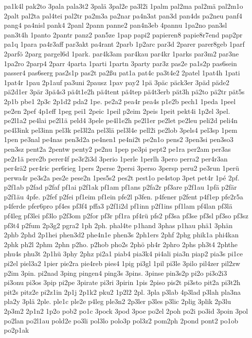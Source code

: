 {pa1k4l
pak2to
3pala
pala3t2
3palä
3pal2e
pa3l2i
1palm
pal2ma
pal2mä
pal2m1o
2palt
pal2ta
pal4tei
pal2tr
pa2m3a
pa2nar
pa4n3at
pan3d
pan4ds
pa2neu
panf4
pang4
pa4nisl
pank4
2panl
2pann
panne2
pan4n3eb
4pannu
1pa2no
pan3sl
pan3t4h
1panto
2pantr
panz2
pan5ze
1pap
papi2
papieren8
papie8r7end
pap2pr
pa1q
1para
pa4r3aff
par3akt
pa4rant
2parb
1p2arc
par3d
2parer
parer8geb
1parf
2parfö
2parg
pargel6d
1park.
par4k3am
par4kau
par4kr
1parks
par3m2
par3ne
1pa2ro
2parp4
2parr
4parta
1parti
1partn
3party
par3z
pas2e
pa1s2p
pas6sein
passer4
pas6serg
pas2s1p
pas2t
pa2ßu
pat1a
pat4c
pa3t4e2
2patel
1pat4h
1pati
1pat4r
1pau
2p1auf
pa3uni
2pausz
1pav
pay2
1pä
3päc
päck3er
3päd
päde2
pä2d1er
3pär
3pä4s3
pä4t1e2h
pä4tent
pä4tep
pä4t3erb
pät3h
pä2to
pä2tr
pät5s
2p1b
pbe1
2p3c
2p1d2
pda2
1pe.
pe2a2
pea4r
pea4s
p1e2b
pech1
1peda
1peel
pe2en
2pef
4p1eff
1peg
pei1
2peic
1peil
p2eim
2peis
1peit
pekt4i
1p2el
3pel.
pe2l1a2
pe4lai
pe2l1ä
peld4
3pele
pe4l1e2h
pe2l1er
pe2let
pe2leu
peli2d
peli4n
pe4l3ink
pel3inn
pel3k
pel3l2a
pel3lä
pel3l4e
pell2i
pe2lob
3pels4
pel3sp
1pem
1pen
pe3nal
pe4nas
pen3d2a
pe4nen1
pe4ni2t
pe2n1o
pens2
3pen3si
pen3so3
pen3sz
pent2a
2pentw
penty2
pe2nu
1pep
pe3pi
pept2
pe1ra
per2am
per3as
pe2r1ä
pere2b
perer4f
pe3r2i3d
3perio
1perle
1perlh
3pero
perra2
per4r3an
per4rä2
per4ric
per6rieg
1pers
2perse
2persi
3perso
3persp
peru2
pe3run
1perü
perwa4r
pe3s2a
pes2e
pese2n
1pes5s2
pes2t
pest1o
pe4stop
3pet
pet4r
1pé
2pf.
p2f1ab
p2fad
p2faf
pf1ai
p2f1ak
pf1am
pf1ans
p2fa2r
pf3are
p2f1au
1pfä
p2fär
p2f1äu
4pfe.
p2fef
p2fei
pf1eim
pf1ein
pfe2l
p3fen.
p4fener
p2fent
p4f1ep
pfe2r5a
p4ferde
pfer6pro
pf4es
pf3f4
pffa3
p2f1i2d
pf1inn
p2f1ins
pf1lam
pf4lan
pf3lä
pf4leg
pf3lei
pf3lo
p2f3om
p2for
pf3r
pf1ra
pf4rü
pfs2
pf3sa
pf3se
pf3sl
pf3so
pf3sz
pf3t4
p2fum
2p3g2
pgra2
1ph
2ph.
phal4te
p1hand
3phas
p1hau
phä1
3phän
2phb
2phd
2p1hei
phen3d2
phe4n1e
phen3s
2ph1ers
2phf
2phg
phik1a
phi4kan
2phk
ph2l
2phm
2phn
p2ho.
p2hob
pho2s
2phö
ph4r
2phro
2phs
ph3t4
2phthe
phu4s
phu3t
2p1hü
3phy
2phz
pi2a1
piab4
pia3k4
pi4ali
pia3n
piap2
pia3s
pi1ce
pi2el
piel3a2
1pier
pie2ra
pie4reb
pies4
1pig
pi3gl
1pil
pi3le
3pilo
pil4zer
pil2zw
p2im
3pin.
pi2nad
3ping
pingen4
ping3s
3pins.
3pinse
pin3s2p
pi2o
pi3o2i3
pi3onu
pi3os
3pip
pi2pe
3pirate
pi3ri
3pirin
1pis
2piso
pis2t
pi3sto
pit2a
pi3t2h
pit2s
pitz2e
pi2z1in
2p1j
2p1k2
pku2
1p2l2
2pl.
3pla
p3lab
4p3lad
p3lah
pla3na
pla2y
3plä
2ple.
ple1c
ple2e
p4leg
ple3n2
2p3ler
p3les
p3lic
2plig
3plik
2p3lu
2p3m2
2p1n2
1p2o
pob2
po1c
3pock
3pod
3poe
po2el
2poh
po2i
po3id
3poin
3pol
po2lan
po2l1au
pold2e
po3li
pol3lo
polo3p
pol3z2
pom2ph
2pond
pont2
po1ob
po2p1ak
}

